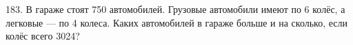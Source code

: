 183. В гараже стоят 750 автомобилей. Грузовые автомобили имеют по 6 колёс, а легковые --- по 4 колеса. Каких автомобилей в гараже больше и на сколько, если колёс всего 3024?\\

